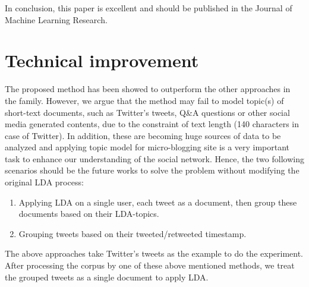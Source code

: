 \documentclass[conference,compsoc]{IEEEtran}
\begin{document}
	In conclusion, this paper is excellent and should be published in the Journal of Machine Learning Research.
	
	\section{Technical improvement}
	The proposed method has been showed to outperform the other approaches in the family.	However, we argue that the method may fail to model topic(s) of short-text documents, such as Twitter's tweets, Q\&A questions or other social media generated contents, due to the constraint of text length (140 characters in case of Twitter). In addition, these are becoming huge sources of data to be analyzed and applying topic model for micro-blogging site is a very important task to enhance our understanding of the social network. Hence, the two following scenarios should be the future works to solve the problem without modifying the original LDA process:
	\begin{enumerate}
		\item Applying LDA on a single user, each tweet as a document, then group these documents based on their LDA-topics.
		\item Grouping tweets based on their tweeted/retweeted timestamp.
	\end{enumerate}
	The above approaches take Twitter's tweets as the example to do the experiment. After processing the corpus by one of these above mentioned methods, we treat the grouped tweets as a single document to apply LDA.

	
\end{document}
